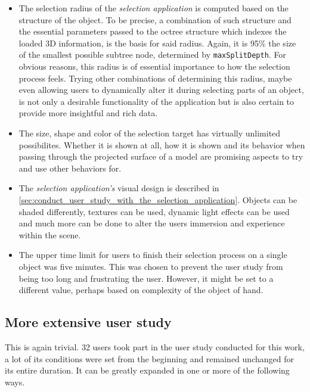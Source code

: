 \begin{itemize}
	\item The selection radius of the \textit{selection application} is computed based on the structure of the object. To be precise, a combination of such structure and the essential parameters passed to the octree structure which indexes the loaded 3D information, is the basis for said radius. Again, it is 95\% the size of the smallest possible subtree node, determined by \texttt{maxSplitDepth}. For obvious reasons, this radius is of essential importance to how the selection process feels. Trying other combinations of determining this radius, maybe even allowing users to dynamically alter it during selecting parts of an object, is not only a desirable functionality of the application but is also certain to provide more insightful and rich data.
	\item The size, shape and color of the selection target has virtually unlimited possibilites. Whether it is shown at all, how it is shown and its behavior when passing through the projected surface of a model are promising aspects to try and use other behaviors for.
	\item The \textit{selection application's} visual design is described in \ref{sec:conduct_user_study_with_the_selection_application}. Objects can be shaded differently, textures can be used, dynamic light effects can be used and much more can be done to alter the users immersion and experience within the scene.
	\item The upper time limit for users to finish their selection process on a single object was five minutes. This was chosen to prevent the user study from being too long and frustrating the user. However, it might be set to a different value, perhaps based on complexity of the object of hand.
\end{itemize}

	\subsection{More extensive user study}
	\label{sec:more_extensive_user_study}
This is again trivial. 32 users took part in the user study conducted for this work, a lot of its conditions were set from the beginning and remained unchanged for its entire duration. It can be greatly expanded in one or more of the following ways.

